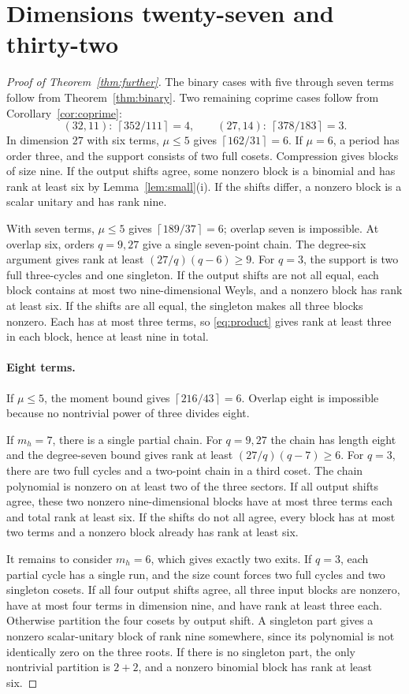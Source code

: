 \documentclass[11pt,a4paper]{article}
\theoremstyle{remark}\newtheorem{remark}[theorem]{Remark}
\newcommand{\ceil}[1]{\left\lceil #1\right\rceil}
\begin{document}
\section{Dimensions twenty-seven and thirty-two}
\begin{proof}[Proof of Theorem~\ref{thm:further}]
The binary cases with five through seven terms follow from Theorem~\ref{thm:binary}. Two remaining coprime cases follow from Corollary~\ref{cor:coprime}:
\[
 (32,11):\ \ceil{352/111}=4,\qquad
 (27,14):\ \ceil{378/183}=3.
\]
In dimension $27$ with six terms, $\mu\le5$ gives $\ceil{162/31}=6$. If $\mu=6$, a period has order three, and the support consists of two full cosets. Compression gives blocks of size nine. If the output shifts agree, some nonzero block is a binomial and has rank at least six by Lemma~\ref{lem:small}(i). If the shifts differ, a nonzero block is a scalar unitary and has rank nine.

With seven terms, $\mu\le5$ gives $\ceil{189/37}=6$; overlap seven is impossible. At overlap six, orders $q=9,27$ give a single seven-point chain. The degree-six argument gives rank at least $(27/q)(q-6)\ge9$. For $q=3$, the support is two full three-cycles and one singleton. If the output shifts are not all equal, each block contains at most two nine-dimensional Weyls, and a nonzero block has rank at least six. If the shifts are all equal, the singleton makes all three blocks nonzero. Each has at most three terms, so \eqref{eq:product} gives rank at least three in each block, hence at least nine in total.

\paragraph{Eight terms.}
If $\mu\le5$, the moment bound gives $\ceil{216/43}=6$. Overlap eight is impossible because no nontrivial power of three divides eight.

If $m_h=7$, there is a single partial chain. For $q=9,27$ the chain has length eight and the degree-seven bound gives rank at least $(27/q)(q-7)\ge6$. For $q=3$, there are two full cycles and a two-point chain in a third coset. The chain polynomial is nonzero on at least two of the three sectors. If all output shifts agree, these two nonzero nine-dimensional blocks have at most three terms each and total rank at least six. If the shifts do not all agree, every block has at most two terms and a nonzero block already has rank at least six.

It remains to consider $m_h=6$, which gives exactly two exits. If $q=3$, each partial cycle has a single run, and the size count forces two full cycles and two singleton cosets. If all four output shifts agree, all three input blocks are nonzero, have at most four terms in dimension nine, and have rank at least three each. Otherwise partition the four cosets by output shift. A singleton part gives a nonzero scalar-unitary block of rank nine somewhere, since its polynomial is not identically zero on the three roots. If there is no singleton part, the only nontrivial partition is $2+2$, and a nonzero binomial block has rank at least six.


\end{proof}
\end{document}
